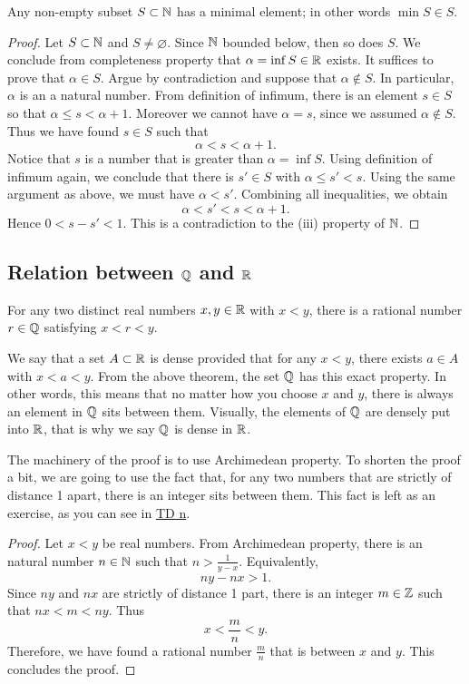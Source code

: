\documentclass[12pt]{article}
\begin{document}
\begin{theorem}
  Any non-empty subset \(S\subset\mathbb{N}\) has a minimal element;
  in other words \(\min S\in S\).
\end{theorem}
\begin{proof}
  Let \(S\subset\mathbb{N}\) and \(S\neq\varnothing\). Since \(\mathbb{N}\) bounded below,
  then so does \(S\). We conclude from completeness property that
  \(\alpha = \inf S\in\mathbb{R}\) exists.
  It suffices to prove that \(\alpha \in S\). Argue by contradiction and
  suppose that \(\alpha\notin S\). In particular, \(\alpha\) is an a natural
  number.
  From definition of infimum, there is an element \(s\in S\) so that
  \(\alpha \leq s<\alpha+1  \).
  Moreover we cannot have \(\alpha=s\), since we assumed \(\alpha\notin S\).
  Thus we have found \(s\in S\) such that
  \[\alpha<s<\alpha+1.\]
  Notice that \(s\) is a number that is greater than \(\alpha=\inf S\).
  Using definition of infimum again, we conclude that there is
  \(s'\in S\) with \(\alpha \leq s' < s\). Using the same argument as above,
  we must have \(\alpha < s'\). Combining all inequalities, we obtain
  \[\alpha < s' < s < \alpha+1. \]
  Hence \(0< s-s' <  1\). This is a contradiction to the (iii) property
  of \(\mathbb{N}\).
\end{proof}



\subsection{Relation between \(\Q\) and \(\R\)}

\begin{theorem}[Density of \(\Q\) in \(\R\)]
  For any two distinct real numbers \(x,y\in\mathbb{R}\) with \(x<y\),
  there is a rational number \(r\in\mathbb{Q}\) satisfying
  \(x<r<y\).
\end{theorem}
We say that a set \(A\subset\mathbb{R}\) is dense provided that
for any \(x<y\), there exists \(a\in A\) with \(x<a<y\).
From the above theorem, the set \(\Q\) has this exact property.
In other words, this means that no matter how you choose \(x\) and \(y\),
there is always an element in \(\Q\) sits between them.
Visually, the elements of \(\Q\) are densely put into \(\R\),
that is why we say \(\Q\) is dense in \(\R\).

The machinery of the proof is to use Archimedean property.
To shorten the proof a bit, we are going to use the fact that,
for any two numbers that are strictly of distance 1 apart,
there is an integer sits between them. This fact is left as
an exercise, as you can see in
\href{https://sivmeng.com/real-analysis-2425/td/td1.pdf}{\sffamily TD n}.

\begin{proof}
  Let \(x<y\) be real numbers. From Archimedean property,
  there is an natural number \(n\in\mathbb{N}\) such that \(n>\frac{1}{y-x}\).
  Equivalently,
  \[ny - nx >1.\]
  Since \(ny\) and \(nx\) are strictly of distance 1 part,
  there is an integer \(m\in\mathbb{Z}\) such that \(nx<m<ny\).
  Thus
  \[x < \frac{m}{n} < y.\]
  Therefore, we have found a rational number \(\frac{m}{n}\)
  that is between \(x\) and \(y\). This concludes the proof.
\end{proof}
\end{document}
